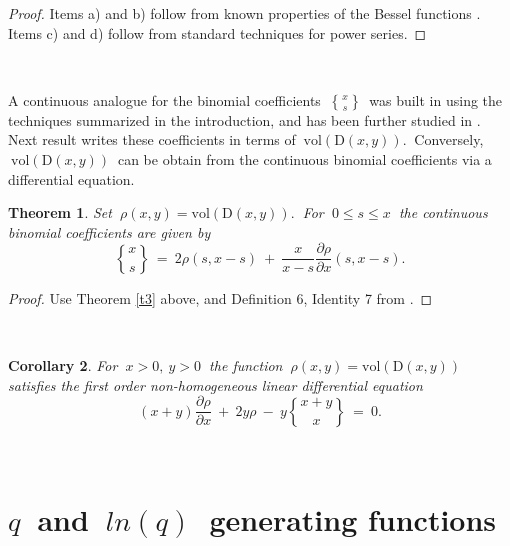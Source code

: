 \documentclass[10pt,leqeq]{article}
\newtheorem{thm}{Theorem}%
\newtheorem{cor}[thm]{Corollary}%
\begin{document}
\begin{proof}
Items a) and b) follow from known properties  of the Bessel functions
\cite{n}. Items c) and d) follow from standard techniques for power series. 
\end{proof}

\

A continuous analogue for the binomial coefficients $\ \displaystyle { x \brace s } \ $ was built in  \cite{cd, dc} using the techniques summarized in the introduction, and has been further studied in \cite{lrvw, rod, vw}. Next result 
writes these coefficients in terms of $\ \mathrm{vol}(\mathrm{D}(x,y)). \ $
Conversely, $\ \mathrm{vol}(\mathrm{D}(x,y)) \ $ can be obtain from the continuous  binomial coefficients via a differential equation.\\

\begin{thm}
{\em Set $\ \rho(x,y)=\mathrm{vol}(\mathrm{D}(x,y)). \ $ For $\ 0 \leq s \leq x \ $ the continuous binomial coefficients
are given by
$${ x \brace s } \ = \ 2\rho(s,x-s) \ + \
 \frac{x}{x-s}\frac{\partial \rho}{\partial x }(s,x-s) .$$   

}
\end{thm}

\begin{proof}
Use Theorem \ref{t3} above,  and Definition 6, Identity 7  from \cite{cd}.
\end{proof}

\

\begin{cor}
{\em  For $\ x>0, \ y> 0 \ $ the function $ \ \rho(x,y)=\mathrm{vol}(\mathrm{D}(x,y)) \ $ satisfies the first order non-homogeneous linear differential equation 
$$(x+y)\frac{\partial \rho}{\partial x } \ + \ 
2y\rho \ - \ y { x+y \brace x } \ = \  0.$$   

}
\end{cor}

\


\section{$ q\ $ and $ \ ln(q)\ $ generating functions}
\end{document}
